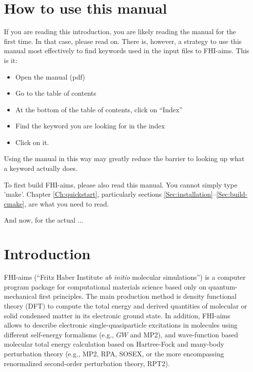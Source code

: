 \chapter*{How to use this manual}

If you are reading this introduction, you are likely reading the
manual for the first time. In that case, please read on. There is,
however, a strategy to use this manual most effectively to find
keywords used in the input files to FHI-aims. This is it:
\begin{itemize}
  \item Open the manual (pdf)
  \item Go to the table of contents
  \item At the bottom of the table of contents, click on ``Index''
  \item Find the keyword you are looking for in the index
  \item Click on it.
\end{itemize}
Using the manual in this way may greatly reduce the barrier to looking up
what a keyword actually does.

To first build FHI-aims, please also read this manual. You cannot simply type 'make'.
Chapter \ref{Ch:quickstart}, particularly sections \ref{Sec:installation}--\ref{Sec:build-cmake},
are what you need to read.

And now, for the actual ...

\chapter*{Introduction}

FHI-aims (``Fritz Haber Institute \emph{ab initio} molecular simulations'') is
a computer program package for computational materials science based only on
quantum-mechanical first principles. The main production method is density
functional theory (DFT) \cite{Hohenberg64,Kohn65,Dreizler90} to compute the total energy and
derived quantities of molecular or solid condensed matter in its electronic
ground state. In addition, FHI-aims allows to describe electronic
single-quasiparticle excitations in molecules using different self-energy
formalisms (e.g., $GW$ and MP2), and wave-function based molecular total energy
calculation based on Hartree-Fock and many-body perturbation theory (e.g., MP2,
RPA, SOSEX, or the more encompassing renormalized second-order
perturbation theory, RPT2). 

